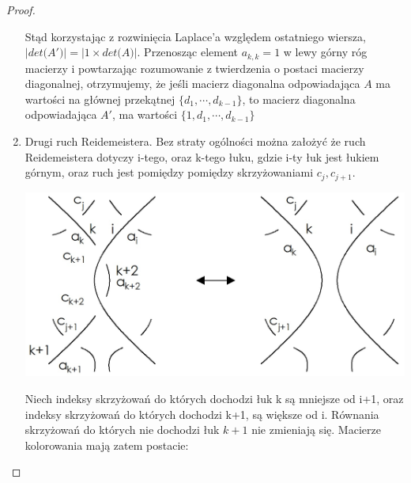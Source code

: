\begin{proof}
\begin{enumerate}
\begin{minipage}{0.5\textwidth}
\begin{center}
\end{center}
\end{minipage}

Stąd korzystając z rozwinięcia Laplace'a względem ostatniego wiersza, $\vert det \big(A'\big) \vert = \vert 1 \times det \big(A\big) \vert$. Przenosząc element $a_{k,k} =1$ w lewy górny róg macierzy i powtarzając rozumowanie z twierdzenia o postaci macierzy diagonalnej, otrzymujemy, że jeśli macierz diagonalna odpowiadająca $A$ ma wartości na głównej przekątnej $\lbrace d_{1}, \cdots, d_{k-1} \rbrace$, to macierz diagonalna odpowiadająca $A'$, ma wartości $\lbrace 1, d_{1}, \cdots, d_{k-1} \rbrace$

\item Drugi ruch Reidemeistera. Bez straty ogólności można założyć że ruch Reidemeistera dotyczy i-tego, oraz k-tego łuku, gdzie i-ty łuk jest łukiem górnym, oraz ruch jest pomiędzy pomiędzy skrzyżowaniami $ c_{j}, c_{j+1}$. 

\begin{center}
			\includegraphics[scale=0.25]{2/Obrazy/R2det}
\end{center}

Niech indeksy skrzyżowań do których dochodzi łuk k są mniejsze od i+1, oraz indeksy skrzyżowań do których dochodzi k+1, są większe od i. Równania skrzyżowań do których nie dochodzi łuk $k+1$ nie zmieniają się. Macierze kolorowania mają zatem postacie:

\begin{center}


\end{center}
\end{enumerate}
\end{proof}
